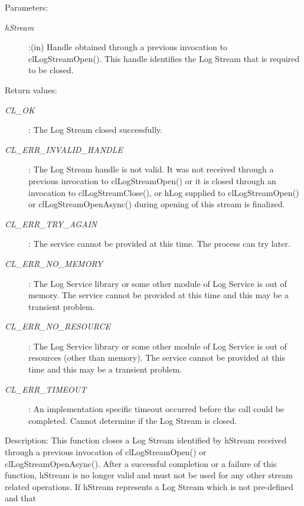 \begin{flushleft}
\begin{Desc}
\begin{verbatim}
\end{verbatim}
\normalsize
\end{Desc}
\begin{Desc}
\item[Parameters:] \begin{description}
\item[{\em hStream}]:(in) Handle obtained through a previous invocation to clLogStreamOpen(). This handle identifies the Log Stream that is required 
to be closed.
\end{description}
\end{Desc}
\begin{Desc}
\item[Return values:]
\begin{description}
\item[{\em CL\_\-OK}]: The Log Stream closed successfully.
\item[{\em CL\_\-ERR\_\-INVALID\_\-HANDLE}]: The Log Stream handle is not valid. It was not received through a previous invocation to 
clLogStreamOpen() or it is closed through an invocation to clLogStreamClose(), or hLog supplied to clLogStreamOpen() or 
clLogStreamOpenAsync() during opening of this stream is finalized.
\item[{\em CL\_\-ERR\_\-TRY\_\-AGAIN}]: The service cannot be provided at this time. The process can try later.
\item[{\em CL\_\-ERR\_\-NO\_\-MEMORY}]: The Log Service library or some other module of Log Service is out of memory. The service cannot 
be provided at this time and this may be a transient problem.
\item[{\em CL\_\-ERR\_\-NO\_\-RESOURCE}]: The Log Service library or some other module of Log Service is out of resources 
(other than memory). The service cannot be provided at this time and this may be a transient problem.
\item[{\em CL\_\-ERR\_\-TIMEOUT}]: An implementation specific timeout occurred before the call could be completed. Cannot determine if
the Log Stream is closed.
\end{description}
\end{Desc}
\begin{Desc}
\item[Description:] This function closes a Log Stream identified by hStream received through a previous invocation of  
clLogStreamOpen() or clLogStreamOpenAsync(). After a successful completion or a failure of this function, hStream is no 
longer valid and must not be used for any other stream related operations. If hStream represents a Log Stream which is not pre-defined and that 

\end{Desc}
\end{flushleft}
